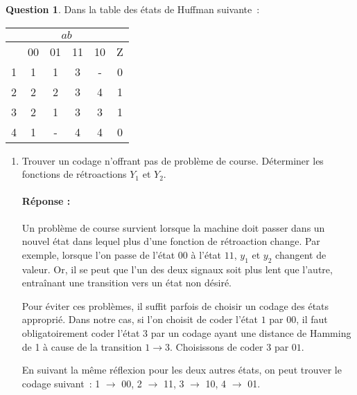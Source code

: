 \documentclass[11pt,a4paper]{article}
\theoremstyle{definition}%
\newtheorem{Q}{Question}[] %
\newcommand{\reponse}[1]{%
	\ifthenelse {\boolean{corrige}} {\paragraph{Réponse :} \color{darkblue}   #1\color{black}} {}
 }
\begin{document}





\begin{Q}
Dans la table des états de Huffman suivante~:
\begin{center}
	\begin{tabular}{|c|c|c|c|c|c|}\hline
	& \multicolumn{4}{c|}{$ab$} & \\ \hline
	  & 00 & 01 & 11 & 10 & Z \\ \hline
	1 & 1 & 1 & 3 & - & 0 \\ \hline
	2 & 2 & 2 & 3 & 4 & 1 \\ \hline
	3 & 2 & 1 & 3 & 3 & 1 \\ \hline
	4 & 1 & - & 4 & 4 & 0 \\ \hline
	\end{tabular}
\end{center}
\begin{enumerate}
	\item Trouver un codage n'offrant pas de problème de course.
	Déterminer les fonctions de rétroactions $Y_1$ et $Y_2$.
	\reponse{

		Un problème de course survient lorsque la machine doit passer dans un nouvel état dans lequel plus d'une fonction de rétroaction change.
		Par exemple, lorsque l'on passe de l'état $00$ à l'état $11$, $y_1$ et $y_2$ changent de valeur.
		Or, il se peut que l'un des deux signaux soit plus lent que l'autre, entraînant une transition vers un état non désiré.

		Pour éviter ces problèmes, il suffit parfois de choisir un codage des états approprié.
		Dans notre cas, si l'on choisit de coder l'état $1$ par $00$, il faut obligatoirement coder l'état $3$ par un codage ayant une distance de Hamming de 1 à cause de la transition $1 \rightarrow 3$.
		Choisissons de coder $3$ par $01$.

		En suivant la même réflexion pour les deux autres états, on peut trouver le codage suivant~:
		1 $\rightarrow$ 00, 2 $\rightarrow$ 11, 3 $\rightarrow$ 10, 4 $\rightarrow$ 01.

}
\end{enumerate}
\end{Q}
\end{document}
